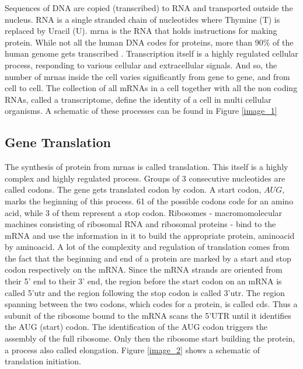 \documentclass[12pt]{article}
\begin{document}
Sequences of DNA are copied (transcribed) to RNA and transported outside the nucleus. RNA is a single stranded chain of nucleotides where Thymine (T) is replaced by Uracil (U). \gls{mrna} is the RNA that holds instructions for making protein. While not all the human DNA codes for proteins, more than 90\% of the human genome gets transcribed \cite{Pertea2012}. Transcription itself is a highly regulated cellular process, responding to various cellular and extracellular signals\cite{Hahn2011}. And so,  the number of \acrshort{mrna}s inside the cell varies significantly from gene to gene, and from cell to cell. The collection of all mRNAs in a cell together with all the non coding RNAs, called a transcriptome, define the identity of a cell in multi cellular organisms. A schematic of these processes can be found in Figure \ref{image_1}



\subsection{Gene Translation}
The synthesis of protein from \acrshort{mrna}s is called translation. This itself is a highly complex and highly regulated process. Groups of 3 consecutive nucleotides are called codons. The gene gets translated codon by codon. A start codon, $AUG$, marks the beginning of this process. 61 of the possible codons code for an amino acid, while 3 of them represent a stop codon. Ribosomes - macromomolecular machines consisting of ribosomal RNA and ribosomal proteins - bind to the mRNA and use the information in it to build the appropriate protein, aminoacid by aminoacid. A lot of the complexity and regulation of translation comes from the fact that the beginning and end of a protein are marked by a start and stop codon respectively on the mRNA. Since the mRNA strands are oriented from their 5' end to their 3' end, the region before the start codon on an mRNA is called 5'\gls{utr} and the region following the stop codon is called 3'\acrshort{utr}. The region spanning  between the two codons, which codes for a protein, is  called \gls{cds}. Thus a subunit of the ribosome bound to the mRNA scans the 5'UTR until it identifies the AUG (start) codon. The identification of the AUG codon triggers the assembly of the full ribosome. Only then the ribosome start building the protein, a process also called elongation. Figure \ref{image_2} shows a schematic of translation initiation.


\end{document}
